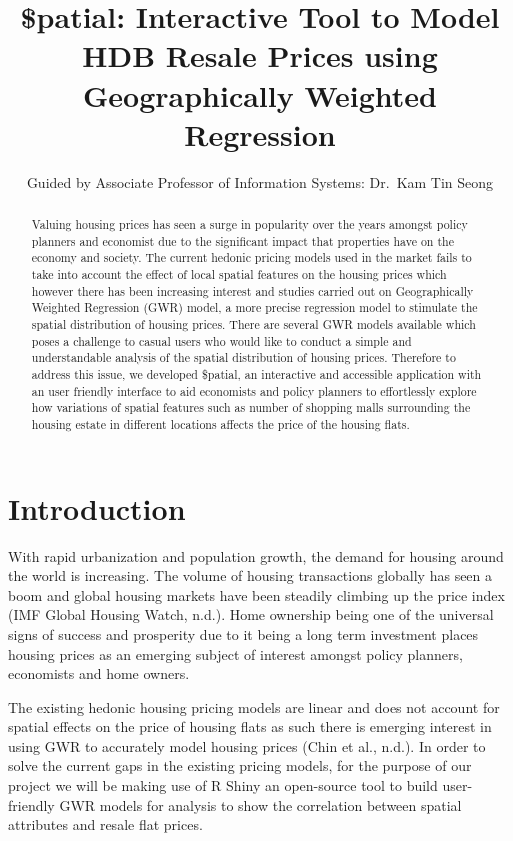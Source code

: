 \documentclass{acm_proc_article-sp}
\title{\$patial: Interactive Tool to Model HDB Resale Prices using
Geographically Weighted Regression}
\subtitle{Guided by Associate Professor of Information Systems: Dr.~Kam Tin Seong}
\author{
\alignauthor Shawn CHUA Jun Yong \\
        \affaddr{School of Information Systems\\
Singapore Management University (SMU)}\\
       \email{\href{mailto:shawn.chua.2018@sis.smu.edu.sg}{\nolinkurl{shawn.chua.2018@sis.smu.edu.sg}}}
\and \alignauthor Olivia GOO Yu Ya \\
        \affaddr{School Of Social Sciences\\
Singapore Management University (SMU)}\\
       \email{\href{mailto:olivia.goo.2018@socsc.smu.edu.sg}{\nolinkurl{olivia.goo.2018@socsc.smu.edu.sg}}}
\and }
\date{}
\begin{document}
\maketitle

\begin{abstract}
Valuing housing prices has seen a surge in popularity over the years
amongst policy planners and economist due to the significant impact that
properties have on the economy and society. The current hedonic pricing
models used in the market fails to take into account the effect of local
spatial features on the housing prices which however there has been
increasing interest and studies carried out on Geographically Weighted
Regression (GWR) model, a more precise regression model to stimulate the
spatial distribution of housing prices. There are several GWR models
available which poses a challenge to casual users who would like to
conduct a simple and understandable analysis of the spatial distribution
of housing prices. Therefore to address this issue, we developed
\$patial, an interactive and accessible application with an user
friendly interface to aid economists and policy planners to effortlessly
explore how variations of spatial features such as number of shopping
malls surrounding the housing estate in different locations affects the
price of the housing flats.
\end{abstract}

\hypertarget{introduction}{%
\section{Introduction}\label{introduction}}

With rapid urbanization and population growth, the demand for housing
around the world is increasing. The volume of housing transactions
globally has seen a boom and global housing markets have been steadily
climbing up the price index (IMF Global Housing Watch, n.d.). Home
ownership being one of the universal signs of success and prosperity due
to it being a long term investment places housing prices as an emerging
subject of interest amongst policy planners, economists and home owners.

The existing hedonic housing pricing models are linear and does not
account for spatial effects on the price of housing flats as such there
is emerging interest in using GWR to accurately model housing prices
(Chin et al., n.d.). In order to solve the current gaps in the existing
pricing models, for the purpose of our project we will be making use of
R Shiny an open-source tool to build user-friendly GWR models for
analysis to show the correlation between spatial attributes and resale
flat prices.
\end{document}
